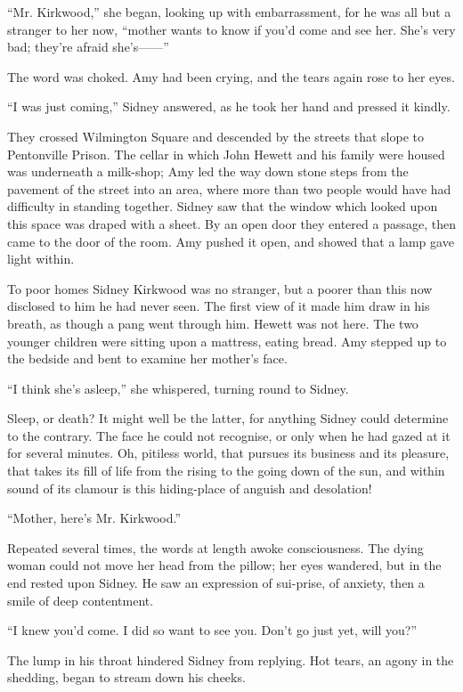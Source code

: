 ``Mr. Kirkwood,'' she began, looking up with embarrassment, for he was
all but a stranger to her now, ``mother wants to know if you'd come and
see her. She's very bad; they're afraid {she's{{------}}''}

The word was choked. Amy had been crying, and the tears again rose to
her eyes.

``I was just coming,'' Sidney answered, as he took her hand and pressed
it kindly.

They crossed Wilmington Square and descended by the streets that slope
to Pentonville Prison. The cellar in which John Hewett and his family
were housed was underneath a milk-shop; Amy led the way down stone steps
from the pavement of the street into an area, where more than two people
would have had difficulty in standing together. Sidney saw that the
window which looked upon this space was draped with a {}sheet. By an
open door they entered a passage, then came to the door of the room. Amy
pushed it open, and showed that a lamp gave light within.

To poor homes Sidney Kirkwood was no stranger, but a poorer than this
now disclosed to him he had never seen. The first view of it made him
draw in his breath, as though a pang went through him. Hewett was not
here. The two younger children were sitting upon a mattress, eating
bread. Amy stepped up to the bedside and bent to examine her mother's
face.

``I think she's asleep,'' she whispered, turning round to Sidney.

Sleep, or death? It might well be the latter, for anything Sidney could
determine to the contrary. The face he could not recognise, or only when
he had gazed at it for several minutes. Oh, pitiless world, that pursues
its business and its pleasure, that takes its fill of life from the
rising to the going down of the sun, and within sound of its clamour is
this hiding-place of anguish and desolation!

{}``Mother, here's Mr. Kirkwood.''

Repeated several times, the words at length awoke consciousness. The
dying woman could not move her head from the pillow; her eyes wandered,
but in the end rested upon Sidney. He saw an expression of sui-prise, of
anxiety, then a smile of deep contentment.

``I knew you'd come. I did so want to see you. Don't go just yet, will
you?''

The lump in his throat hindered Sidney from replying. Hot tears, an
agony in the shedding, began to stream down his cheeks.

